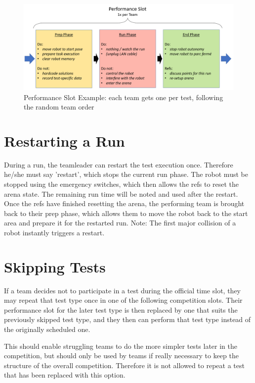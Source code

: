 \begin{figure} [h!]
	\begin{center}
		\includegraphics[width= 0.9\linewidth]{./images/competition/performance_slot}
	\end{center}
	\caption{Performance Slot Example: each team gets one per test, following the random team order}
	\label{fig:performance slot example}
\end{figure}


\section{Restarting a Run}

During a run, the teamleader can restart the test execution once.
Therefore he/she must say 'restart', which stops the current run phase. The robot must be stopped using the emergency switches, which then allows the refs to reset the arena state.
The remaining run time will be noted and used after the restart. Once the refs have finished resetting the arena, the performing team is brought back to their prep phase, which allows them to move the robot back to the start area and prepare it for the restarted run.
Note: The first major collision of a robot instantly triggers a restart.

\section{Skipping Tests}

If a team decides not to participate in a test during the official time slot, 
they may repeat that test type once in one of the following competition slots.
Their performance slot for the later test type is then replaced by one that suits the previously skipped test type, and they then can perform that test type instead of the originally scheduled one.

This should enable struggling teams to do the more simpler tests later in the competition,
but should only be used by teams if really necessary to keep the structure of the overall competition. 
Therefore it is not allowed to repeat a test that has been replaced with this option.

